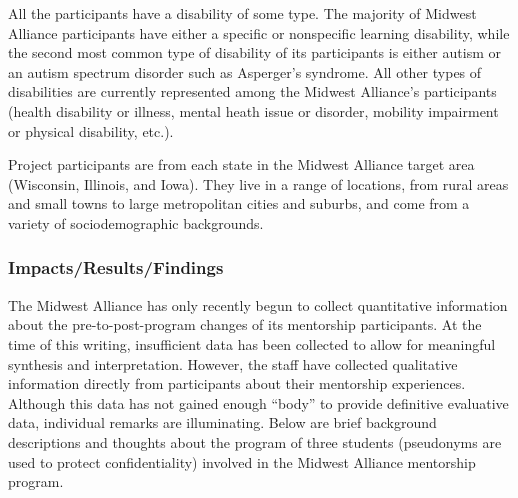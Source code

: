 \documentclass[11.5pt]{sig-alternate} %
\begin{document}
\begin{large}
All the participants have a disability of some type. The majority of Midwest Alliance participants have either a specific or nonspecific learning disability, while the second most common type of disability of its participants is either autism or an autism spectrum disorder such as Asperger's syndrome. All other types of disabilities are currently represented among the Midwest Alliance's participants (health disability or illness, mental heath issue or disorder, mobility impairment or physical disability, etc.).

Project participants are from each state in the Midwest Alliance target area (Wisconsin, Illinois, and Iowa). They live in a range of locations, from rural areas and small towns to large metropolitan cities and suburbs, and come from a variety of sociodemographic backgrounds.

\subsubsection*{Impacts/Results/Findings}
The Midwest Alliance has only recently begun to collect quantitative information about the pre-to-post-program changes of its mentorship participants. At the time of this writing, insufficient data has been collected to allow for meaningful synthesis and interpretation. However, the staff have collected qualitative information directly from participants about their mentorship experiences. Although this data has not gained enough “body” to provide definitive evaluative data, individual remarks are illuminating. Below are brief background descriptions and thoughts about the program of three students (pseudonyms are used to protect confidentiality) involved in the Midwest Alliance mentorship program.


\end{large}
\end{document}
